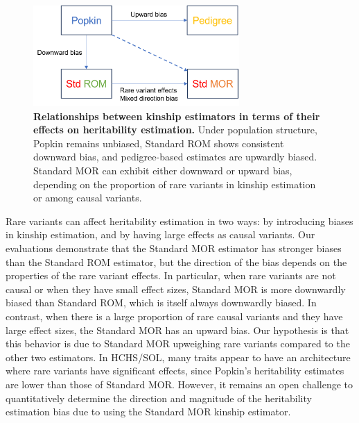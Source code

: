 \documentclass[11pt]{article}
\begin{document}
\begin{figure}[bp!]
  \centering
  \includegraphics[width=0.7\textwidth]{data/est_relationships.png}
  \caption{
    {\bf Relationships between kinship estimators in terms of their effects on heritability estimation.}
Under population structure, Popkin remains unbiased, Standard ROM shows consistent downward bias, and pedigree-based estimates are upwardly biased. Standard MOR can exhibit either downward or upward bias, depending on the proportion of rare variants in kinship estimation or among causal variants.
}
  \label{fig:est_relationship}
\end{figure}


Rare variants can affect heritability estimation in two ways: by introducing biases in kinship estimation, and by having large effects as causal variants.
Our evaluations demonstrate that the Standard MOR estimator has stronger biases than the Standard ROM estimator, but the direction of the bias depends on the properties of the rare variant effects.
In particular, when rare variants are not causal or when they have small effect sizes, Standard MOR is more downwardly biased than Standard ROM, which is itself always downwardly biased.
In contrast, when there is a large proportion of rare causal variants and they have large effect sizes, the Standard MOR has an upward bias.
Our hypothesis is that this behavior is due to Standard MOR upweighing rare variants compared to the other two estimators.
In HCHS/SOL, many traits appear to have an architecture where rare variants have significant effects, since Popkin's heritability estimates are lower than those of Standard MOR.
However, it remains an open challenge to quantitatively determine the direction and magnitude of the heritability estimation bias due to using the Standard MOR kinship estimator.
\end{document}

